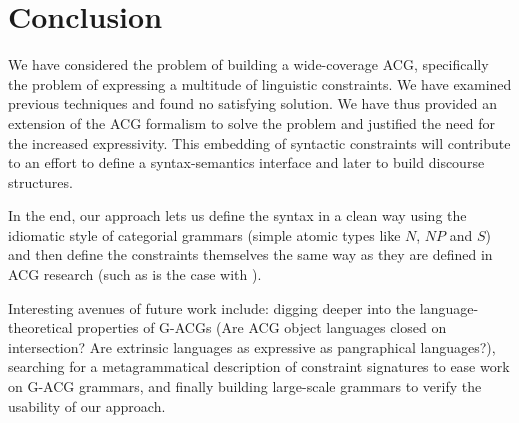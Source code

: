 \documentclass{llncs}
\begin{document}
\section{Conclusion}

We have considered the problem of building a wide-coverage ACG, specifically
the problem of expressing a multitude of linguistic constraints. We have
examined previous techniques and found no satisfying solution. We have thus
provided an extension of the ACG formalism to solve the problem and justified
the need for the increased expressivity. This embedding of syntactic
constraints will contribute to an effort to define a syntax-semantics
interface and later to build discourse structures.

In the end, our approach lets us define the syntax in a clean way using the
idiomatic style of categorial grammars (simple atomic types like $N$, $NP$ and
$S$) and then define the constraints themselves the same way as they are
defined in ACG research (such as is the case with
\cite{pogodalla2012controlling}).

Interesting avenues of future work include: digging deeper into the
language-theoretical properties of G-ACGs (Are ACG object languages closed on
intersection? Are extrinsic languages as expressive as pangraphical
languages?), searching for a metagrammatical description of constraint
signatures to ease work on G-ACG grammars, and finally building large-scale
grammars to verify the usability of our approach.


%
%



\end{document}
